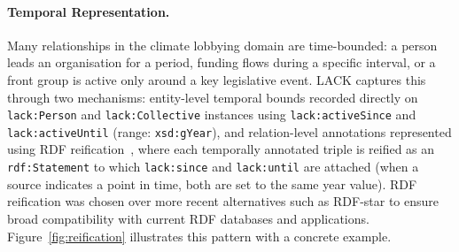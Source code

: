\begin{sloppypar}
\vspace{-0.3cm}\paragraph{Temporal Representation.}
Many relationships in the climate lobbying domain are time-bounded: a person leads an organisation for a period, funding flows during a specific interval, or a front group is active only around a key legislative event.
LACK captures this through two mechanisms: entity-level temporal bounds recorded directly on \texttt{lack:Person} and \texttt{lack:Collective} instances using \texttt{lack:activeSince} and \texttt{lack:activeUntil} (range: \texttt{xsd:gYear}), and relation-level annotations represented using RDF reification~\cite{rdfprimer}, where each temporally annotated triple is reified as an \texttt{rdf:Statement} to which \texttt{lack:since} and \texttt{lack:until} are attached (when a source indicates a point in time, both are set to the same year value).
RDF reification was chosen over more recent alternatives such as RDF-star to ensure broad compatibility with current RDF databases and applications.
Figure~\ref{fig:reification} illustrates this pattern with a concrete example.\end{sloppypar}


